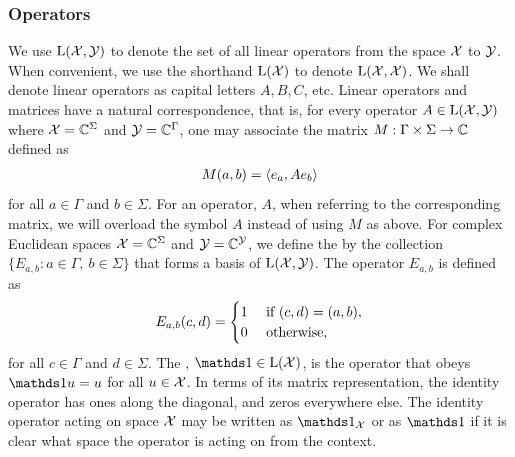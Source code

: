 \subsubsection*{Operators}

We use $\mathrm{L}(\mathcal{X},\mathcal{Y})$ to denote the set of all linear operators from the space $\mathcal{X}$ to $\mathcal{Y}$. When convenient, we use the shorthand $\mathrm{L}(\mathcal{X})$ to denote $\mathrm{L}(\mathcal{X},\mathcal{X})$. We shall denote linear operators as capital letters $A,B,C$, etc. Linear operators and matrices have a natural correspondence, that is, for every operator $A \in \mathrm{L}(\mathcal{X},\mathcal{Y})$ where $\mathcal{X} = \mathbb{C}^{\Sigma}$ and $\mathcal{Y} = \mathbb{C}^{\Gamma}$, one may associate the matrix $M : \Gamma \times \Sigma \rightarrow \mathbb{C}$ defined as 
\begin{align}
	M(a,b) = \langle e_a , A e_b\rangle
\end{align}
for all $a \in \Gamma$ and $b \in \Sigma$. For an operator, $A$, when referring to the corresponding matrix, we will overload the symbol $A$ instead of using $M$ as above. For complex Euclidean spaces $\mathcal{X} = \mathbb{C}^{\Sigma}$ and $\mathcal{Y} = \mathbb{C}^{\mathcal{Y}}$, we define the  by the collection $\{E_{a,b} : a \in \Gamma, \ b \in \Sigma \}$ that forms a basis of $\mathrm{L}(\mathcal{X},\mathcal{Y})$. The operator $E_{a,b}$ is defined as 
\[
 E_{a,b}(c,d) =
  \begin{cases} 
      \hfill 1 \hfill & \text{ if $(c,d) = (a,b)$}, \\
      \hfill 0 \hfill & \text{ otherwise}, \\
  \end{cases}
\]
for all $c \in \Gamma$ and $d \in \Sigma$. The , $\I \in \Lin(\X)$, is the operator that obeys $\I u = u$ for all $u \in \mathcal{X}$. In terms of its matrix representation, the identity operator has ones along the diagonal, and zeros everywhere else. The identity operator acting on space $\mathcal{X}$ may be written as $\I_{\X}$ or as $\I$ if it is clear what space the operator is acting on from the context. 

